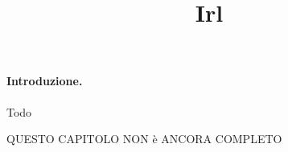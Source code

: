 \title{Irl}
\maketitle
\label{sec:pic-irl}


\paragraph{Introduzione.}
Todo

QUESTO CAPITOLO NON è ANCORA COMPLETO

\iffalse
Mostro poi il sistema reale che ho costruito e su cui si basa il modello.
Concludo illustrando un modo per ottenere alcuni parametri non misurabili
ditettamente.
\fi


